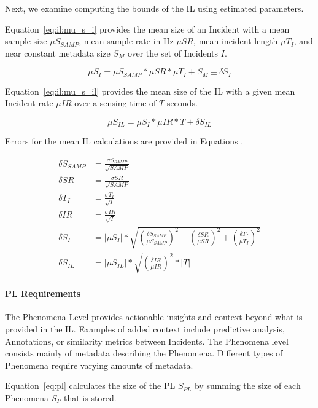 Next, we examine computing the bounds of the IL using estimated parameters.

Equation~\ref{eq:il:mu_s_i} provides the mean size of an Incident with a mean sample size $\mu S_{SAMP}$, mean sample rate in Hz $\mu SR$, mean incident length $\mu T_{I}$, and near constant metadata size $S_{M}$ over the set of Incidents $I$.

\begin{equation}\label{eq:il:mu_s_i}
	\mu S_{I} = \mu S_{SAMP} * \mu SR * \mu T_{I} + S_{M} \pm \delta S_{I}
\end{equation}

Equation~\ref{eq:il:mu_s_il} provides the mean size of the IL with a given mean Incident rate $\mu IR$ over a sensing time of $T$ seconds.

\begin{equation}\label{eq:il:mu_s_il}
	\mu S_{IL} = \mu S_{I} * \mu IR * T \pm \delta S_{IL}
\end{equation}

Errors for the mean IL calculations are provided in Equations .

\begin{align}
	\delta S_{SAMP} &= \frac{\sigma S_{SAMP}}{\sqrt{SAMP}} \label{eq:il0} \\
	\delta SR &= \frac{\sigma SR}{\sqrt{SAMP}} \label{eq:il1} \\
	\delta T_{I} &= \frac{\sigma T_{I}}{\sqrt{I}} \label{eq:il2} \\
	\delta IR &= \frac{\sigma IR}{\sqrt{I}} \label{eq:il3} \\
	\delta S_{I} &= |\mu S_{I}| * \sqrt{(\frac{\delta S_{SAMP}}{\mu S_{SAMP}})^2 + (\frac{\delta SR}{\mu SR})^2 + (\frac{\delta T_{I}}{\mu T_{I}})^2} \label{eq:il4} \\
	\delta S_{IL} &= |\mu S_{IL}| * \sqrt{(\frac{\delta IR}{\mu IR})^2} * |T| \label{eq:il5}
\end{align}

\paragraph{PL Requirements}
The Phenomena Level provides actionable insights and context beyond what is provided in the IL. Examples of added context include predictive analysis, Annotations, or similarity metrics between Incidents. The Phenomena level consists mainly of metadata describing the Phenomena. Different types of Phenomena require varying amounts of metadata.

Equation~\ref{eq:pl} calculates the size of the PL $S_{PL}$ by summing the size of each Phenomena $S_{P}$ that is stored.


